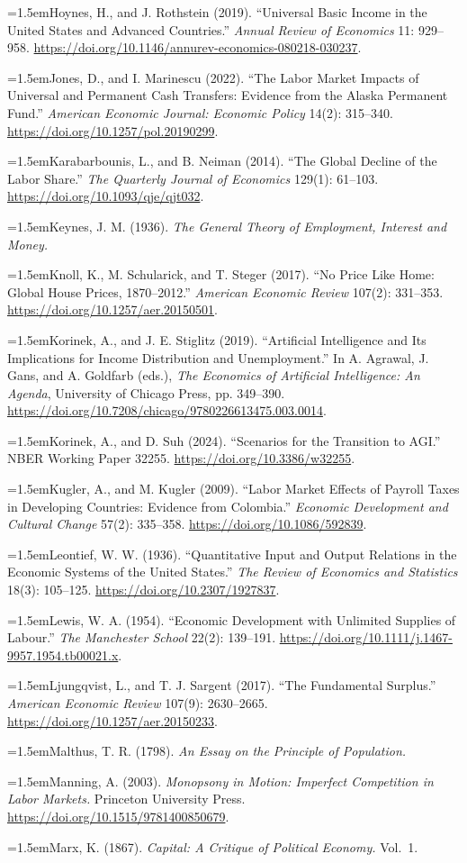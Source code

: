 \documentclass[12pt]{article}
\theoremstyle{plain}
\newcommand{\refentry}[1]{\par\hangindent=1.5em\hangafter=1\noindent #1}
\begin{document}
{\refentry{Hoynes, H., and J. Rothstein (2019). ``Universal Basic Income in the United States and Advanced Countries.'' \emph{Annual Review of Economics} 11: 929--958. \url{https://doi.org/10.1146/annurev-economics-080218-030237}.}
\refentry{Jones, D., and I. Marinescu (2022). ``The Labor Market Impacts of Universal and Permanent Cash Transfers: Evidence from the Alaska Permanent Fund.'' \emph{American Economic Journal: Economic Policy} 14(2): 315--340. \url{https://doi.org/10.1257/pol.20190299}.}
\refentry{Karabarbounis, L., and B. Neiman (2014). ``The Global Decline of the Labor Share.'' \emph{The Quarterly Journal of Economics} 129(1): 61--103. \url{https://doi.org/10.1093/qje/qjt032}.}
\refentry{Keynes, J. M. (1936). \emph{The General Theory of Employment, Interest and Money.}}
\refentry{Knoll, K., M. Schularick, and T. Steger (2017). ``No Price Like Home: Global House Prices, 1870--2012.'' \emph{American Economic Review} 107(2): 331--353. \url{https://doi.org/10.1257/aer.20150501}.}
\refentry{Korinek, A., and J. E. Stiglitz (2019). ``Artificial Intelligence and Its Implications for Income Distribution and Unemployment.'' In A. Agrawal, J. Gans, and A. Goldfarb (eds.), \emph{The Economics of Artificial Intelligence: An Agenda}, University of Chicago Press, pp. 349--390. \url{https://doi.org/10.7208/chicago/9780226613475.003.0014}.}
\refentry{Korinek, A., and D. Suh (2024). ``Scenarios for the Transition to AGI.'' NBER Working Paper 32255. \url{https://doi.org/10.3386/w32255}.}
\refentry{Kugler, A., and M. Kugler (2009). ``Labor Market Effects of Payroll Taxes in Developing Countries: Evidence from Colombia.'' \emph{Economic Development and Cultural Change} 57(2): 335--358. \url{https://doi.org/10.1086/592839}.}
\refentry{Leontief, W. W. (1936). ``Quantitative Input and Output Relations in the Economic Systems of the United States.'' \emph{The Review of Economics and Statistics} 18(3): 105--125. \url{https://doi.org/10.2307/1927837}.}
\refentry{Lewis, W. A. (1954). ``Economic Development with Unlimited Supplies of Labour.'' \emph{The Manchester School} 22(2): 139--191. \url{https://doi.org/10.1111/j.1467-9957.1954.tb00021.x}.}
\refentry{Ljungqvist, L., and T. J. Sargent (2017). ``The Fundamental Surplus.'' \emph{American Economic Review} 107(9): 2630--2665. \url{https://doi.org/10.1257/aer.20150233}.}
\refentry{Malthus, T. R. (1798). \emph{An Essay on the Principle of Population.}}
\refentry{Manning, A. (2003). \emph{Monopsony in Motion: Imperfect Competition in Labor Markets.} Princeton University Press. \url{https://doi.org/10.1515/9781400850679}.}
\refentry{Marx, K. (1867). \emph{Capital: A Critique of Political Economy.} Vol.~1.}
}
\end{document}
